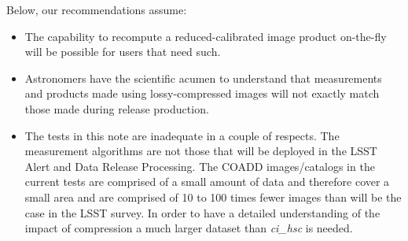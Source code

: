 Below, our recommendations assume:
\begin{itemize}

\item The capability to recompute a reduced-calibrated image product on-the-fly will be 
possible for users that need such.

\item Astronomers have the scientific acumen to understand that measurements and products 
made using lossy-compressed images will not exactly match those made during release production.

\item The tests in this note are inadequate in a couple of respects.  The measurement
algorithms are not those that will be deployed in the LSST Alert and Data Release Processing.
The COADD images/catalogs in the current tests are comprised of a small amount of data
and therefore cover a small area and are comprised of 10 to 100 times fewer images than 
will be the case in the LSST survey.  In order to have a detailed understanding
of the impact of compression a much larger dataset than {\it ci\_hsc} is needed.

\end{itemize}


